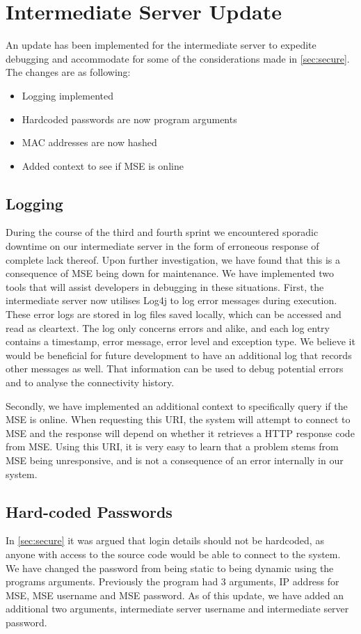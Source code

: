 \section{Intermediate Server Update}
An update has been implemented for the intermediate server to expedite debugging and accommodate for some of the considerations made in \cref{sec:secure}. The changes are as following:
\begin{itemize}
\item Logging implemented
\item Hardcoded passwords are now program arguments
\item MAC addresses are now hashed
\item Added context to see if MSE is online
\end{itemize}

\subsection*{Logging}
During the course of the third and fourth sprint we encountered sporadic downtime on our intermediate server in the form of erroneous response of complete lack thereof. Upon further investigation, we have found that this is a consequence of MSE being down for maintenance. We have implemented two tools that will assist developers in debugging in these situations.
First, the intermediate server now utilises Log4j \cite{log4j} to log error messages during execution. These error logs are stored in log files saved locally, which can be accessed and read as cleartext. The log only concerns errors and alike, and each log entry contains a timestamp, error message, error level and exception type. We believe it would be beneficial for future development to have an additional log that records other messages as well. That information can be used to debug potential errors and to analyse the connectivity history.

Secondly, we have implemented an additional context to specifically query if the MSE is online. When requesting this URI, the system will attempt to connect to MSE and the response will depend on whether it retrieves a HTTP response code from MSE. Using this URI, it is very easy to learn that a problem stems from MSE being unresponsive, and is not a consequence of an error internally in our system.

\subsection*{Hard-coded Passwords}
In \cref{sec:secure} it was argued that login details should not be hardcoded, as anyone with access to the source code would be able to connect to the system. We have changed the password from being static to being dynamic using the programs arguments. Previously the program had 3 arguments, IP address for MSE, MSE username and MSE password. As of this update, we have added an additional two arguments, intermediate server username and intermediate server password.

